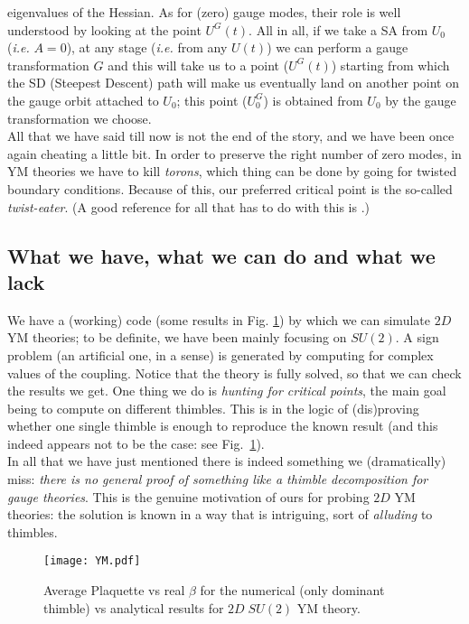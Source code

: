 \documentclass[a4paper,11pt]{article}
\begin{document}
eigenvalues of the Hessian. As for (zero) gauge modes, their role is
well understood by looking at the point $U^{G}(t)$. All in all, 
if we take a SA from $U_0$ ({\em i.e.} $A=0$), at any stage ({\em i.e.} from any $U(t)$) we can 
perform a gauge transformation $G$ and this will take us to a point
($U^{G}(t)$) starting from which the SD (Steepest Descent) path will
make us eventually 
land on another point on the gauge orbit attached to $U_0$;
this point ($U_0^{G}$) is obtained from $U_0$ by the gauge
transformation we choose.\\
All that we have said till now is not the end of the story, and we
have been once again cheating a little bit. In order to preserve 
the right number of zero modes, in YM theories we have to kill 
{\em torons}, which thing can be done by going for twisted boundary 
conditions. Because of this, our preferred critical point is the so-called 
{\em twist-eater}. (A good reference for all that has to do with this
is \cite{torons}.) 

\subsection{What we have, what we can do and what we lack}

We have a (working) code (some results in Fig. \ref{fig:AveragePlaq}) by which we can simulate $2D$ YM theories; to
be definite, we have been mainly focusing on $SU(2)$. A sign problem (an
artificial one, in a sense) is generated by computing for complex
values of the coupling. Notice that the theory is fully solved, so
that we can check the results we get. One thing we do is {\em hunting
  for critical points}, the main goal being to compute on different
thimbles. This is in the logic of (dis)proving whether one single thimble is
enough to reproduce the known result (and this indeed appears not to
be the case: see Fig.~\ref{fig:AveragePlaq}). \\
In all that we have just mentioned there is indeed something we
(dramatically) miss: {\em there is no general proof of something like
  a thimble decomposition for gauge theories}. This is the genuine
motivation of ours for probing $2D$ YM theories: the solution is
known in a way that is intriguing, sort of {\em alluding} to thimbles.

\begin{figure}[ht] 
\centering
\texttt{[image: YM.pdf]}
\caption{Average Plaquette vs real $\beta$ for the numerical (only dominant thimble) vs analytical results for $2D \; SU(2)$ YM theory.}
\label{fig:AveragePlaq}
\end{figure}
\end{document}
